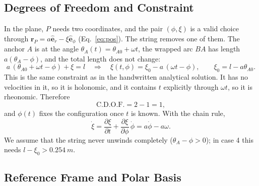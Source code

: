 \documentclass[11pt,a4paper]{article}
\numberwithin{equation}{section}
\newcommand{\er}{\hat{\mathbf{e}}_r}
\newcommand{\ephi}{\hat{\mathbf{e}}_\phi}
\newcommand{\vect}[1]{\mathbf{#1}}
\begin{document}
\subsection{Degrees of Freedom and Constraint}

In the plane, $P$ needs two coordinates, and the pair $(\phi,\xi)$ is a valid choice through $\vect r_P=a\er-\xi\ephi$ (Eq.~\eqref{eq:pos}). The string removes one of them. The anchor $A$ is at the angle $\theta_A(t)=\theta_{A0}+\omega t$, the wrapped arc $BA$ has length $a(\theta_A-\phi)$, and the total length does not change:
\begin{equation}
  a\,(\theta_{A0}+\omega t-\phi) + \xi = l
  \quad\Longrightarrow\quad
  \xi(t,\phi) = \xi_0 - a\,(\omega t - \phi),
  \qquad \xi_0 = l - a\theta_{A0}. \label{eq:constraint}
\end{equation}
This is the same constraint as in the handwritten analytical solution. It has no velocities in it, so it is holonomic, and it contains $t$ explicitly through $\omega t$, so it is rheonomic. Therefore
\begin{equation}
  \text{C.D.O.F.} = 2 - 1 = 1,
\end{equation}
and $\phi(t)$ fixes the configuration once $t$ is known. With the chain rule,
\begin{equation}
  \dot\xi = \frac{\partial \xi}{\partial t} + \frac{\partial \xi}{\partial \phi}\,\dot\phi = a\dot\phi - a\omega. \label{eq:xidot}
\end{equation}
We assume that the string never unwinds completely ($\theta_A-\phi>0$); in case 4 this needs $l-\xi_0>\SI{0.254}{m}$.

\subsection{Reference Frame and Polar Basis}
\end{document}
